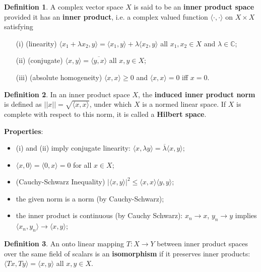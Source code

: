 \documentclass[11pt]{amsart}
\theoremstyle{definition}
\newtheorem*{definition*}{Definition}
\renewcommand\geq{\geqslant}
\renewcommand\leq{\leqslant}
\renewcommand\:{\colon}
\renewcommand\bar[1]{\overline{#1}}
\newcommand{\C}{\mathds{C}}
\begin{document}
\begin{definition*}
	A complex vector space $X$ is said to be an \textbf{inner product space} provided it has an \textbf{inner product}, i.e. a complex valued function $\langle \cdot, \cdot \rangle$ on $X \times X$ satisfying
	\begin{itemize}[leftmargin=32.5pt]\setlength\itemsep{0em}
		\item[(i)] (linearity) $\langle x_1 + \lambda x_2 ,y \rangle = \langle x_1, y \rangle + \lambda \langle x_2, y \rangle$ all $x_1, x_2 \in X$ and $\lambda \in \C$;
		\item[(ii)] (conjugate) $\langle x, y \rangle = \bar{\langle y, x \rangle}$ all $x, y \in X$;
		\item[(iii)] (absolute homogeneity) $\langle x,x \rangle \geq 0$ and $\langle x,x \rangle = 0$ iff $x = 0$.
	\end{itemize}
\end{definition*}

\begin{definition*}
	In an inner product space $X$, the \textbf{induced inner product norm} is defined as $||x|| = \sqrt{\langle x,x \rangle}$, under which $X$ is a normed linear space. If $X$ is complete with respect to this norm, it is called a \textbf{Hilbert space}.
\end{definition*}

\noindent \textbf{Properties}:
\begin{itemize}[leftmargin=*]\setlength\itemsep{0em}
	\item (i) and (ii) imply conjugate linearity: $\langle x, \lambda y \rangle = \bar\lambda \langle x, y \rangle$;
	\item $\langle x, 0 \rangle = \langle 0, x \rangle = 0$ for all $x \in X$;
	\item (Cauchy-Schwarz Inequality) $|\langle x, y \rangle|^2 \leq \langle x,x \rangle \langle y,y \rangle$;
	\item the given norm is a norm (by Cauchy-Schwarz);
	\item the inner product is continuous (by Cauchy Schwarz): $x_n \to x$, $y_n \to y$ implies $\langle x_n, y_n \rangle \to \langle x,y \rangle$;
\end{itemize}

\begin{definition*}
	An onto linear mapping $T\: X \to Y$ between inner product spaces over the same field of scalars is an \textbf{isomorphism} if it preserves inner products: $\langle Tx, Ty \rangle = \langle x, y \rangle$ all $x, y \in X$.
\end{definition*}
\end{document}

